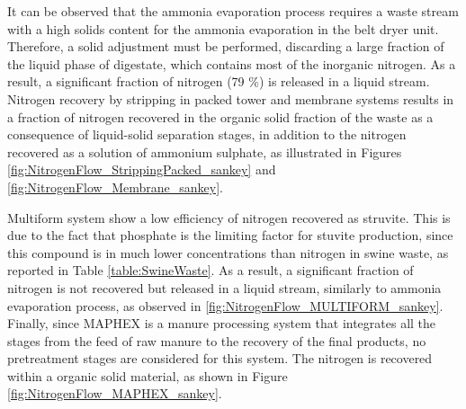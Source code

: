 \begin{refsection}[referencesCh6]
It can be observed that the
ammonia evaporation process
requires a waste stream with a high solids content for the ammonia evaporation in the belt dryer unit.
Therefore, a solid adjustment must be performed, 
discarding a large fraction of the liquid phase of digestate, which contains most of the inorganic nitrogen. As a result, a significant fraction of nitrogen (79 \%) is released in a liquid stream. Nitrogen recovery by stripping in packed tower and membrane systems results in a fraction of nitrogen recovered in the organic solid fraction of the waste as a consequence of liquid-solid separation stages, in addition to the nitrogen recovered as a solution of ammonium sulphate, as illustrated in Figures \ref{fig:NitrogenFlow_StrippingPacked_sankey} and \ref{fig:NitrogenFlow_Membrane_sankey}. 

Multiform system show a low efficiency of nitrogen recovered as struvite. This is due to the fact that phosphate is the limiting factor for stuvite production, since this compound is in much lower concentrations than nitrogen in swine waste, as reported in Table \ref{table:SwineWaste}. As a result, a significant fraction of nitrogen is not recovered but released in a liquid stream, similarly to ammonia evaporation process, as observed in \ref{fig:NitrogenFlow_MULTIFORM_sankey}.
Finally, since MAPHEX is a manure processing system that integrates all the stages from the feed of raw manure to the recovery of the final products, no pretreatment stages are considered for this system. The nitrogen is recovered within a organic solid material, as shown in Figure \ref{fig:NitrogenFlow_MAPHEX_sankey}. 


\end{refsection}
